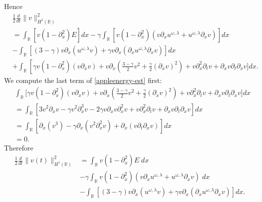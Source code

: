 \documentclass[12pt,reqno]{amsart}
\newcommand{\rr}{\mathbb{R}}
\newcommand{\p}{\partial}
\theoremstyle{plain}  %
\theoremstyle{definition}
\begin{document}
	Hence
	\begin{equation}
		\label{appleenergy-est}
		\begin{split}
			&\frac{1}{2} \frac{d}{dt} \|v\|_{H^1(\rr)}^2  
			\\
		& =  \int_{\rr} \left[ v(1-\p_x^2)E \right]dx
		- \gamma \int_{\rr} \left[ v(1-\p_x^2)(v\p_x u^{\omega,\lambda} + u^{\omega,\lambda} \p_x v) \right]dx
		\\
		&- \int_{\rr}\left[ \left( 3-\gamma \right)v \p_x\left( u^{\omega,\lambda}v \right) + \gamma v
		\p_x \left( \p_x u^{\omega,\lambda} \p_x v \right)\right]dx
		\\
		&+  \int_{\rr}
		\left[ \gamma v \left( 1-\p_x^2 \right)\left( v \p_x v \right) + v
		\p_x \left( \frac{3-\gamma}{2} v^2 + \frac{\gamma}{2}\left( \p_x v \right)^2
		\right) \right . +  v \p_x^2 \p_t v + \p_x v \p_t \p_x v\bigg]dx.
	\end{split}
\end{equation}
We compute the last term of \eqref{appleenergy-est} first:
\begin{equation*}
	\begin{split}
	&  \int_{\rr} \bigg[ \gamma v \left( 1-\p_x^2 \right)(v\p_x v) + v \p_x\left(
	\frac{3-\gamma}{2}v^2 + \frac{\gamma}{2}\left( \p_x v \right )^2 \right)
	+ v\p_x^2 \p_t v + \p_x v \p_t \p_x v
	\bigg]dx
	\\
	& =  \int_{\rr} \left[ 3v^2 \p_x v - \gamma v^2 \p_x^3 v - 2 \gamma v \p_x v \p_x^2
	v + v \p_x^2 \p_t v + \p_x v \p_t \p_x v \right]dx
	\\
	&=  \int_{\rr} \left[ \p_x (v^3) - \gamma \p_x (v^2 \p_x^2 v) + \p_x\left( v \p_t
	\p_x v
	\right) \right]dx
	\\
	& = 0.
\end{split}
\end{equation*}
Therefore			
\begin{equation}
	\label{appleenergy-estimate-simplified}
	\begin{split}
		\frac{1}{2}	\frac{d}{dt} \|v(t)\|_{H^1(\rr)}^2
		& =  \int_{\rr}
		 v\left( 1-\p_x^2
	\right)E \; dx
	\\
	&-  \gamma  \int_{\rr}  v\left( 1-\p_x^2 \right)\left( v \p_x u^{\omega,\lambda}
	+ u^{\omega,\lambda} \p_x v
	\right) \; dx
	\\
	& -  \int_{\rr} \left[ \left( 3-\gamma \right)v \p_x \left( u^{\omega,\lambda}v \right) + \gamma v
	\p_x \left( \p_x u^{\omega,\lambda} \p_x v \right)\right]dx.
\end{split}
\end{equation}
\end{document}
